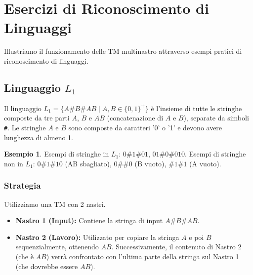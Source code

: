 \documentclass[a4paper]{article}
\theoremstyle{definition} %
\newtheorem{example}{Esempio}
\begin{document}
\section{Esercizi di Riconoscimento di Linguaggi}
Illustriamo il funzionamento delle TM multinastro attraverso esempi pratici di riconoscimento di linguaggi.

\subsection{Linguaggio $L_1$}
Il linguaggio $L_1 = \{A\#B\#AB \mid A,B \in \{0,1\}^+\}$ è l'insieme di tutte le stringhe composte da tre parti $A$, $B$ e $AB$ (concatenazione di $A$ e $B$), separate da simboli \texttt{\#}. Le stringhe $A$ e $B$ sono composte da caratteri '0' o '1' e devono avere lunghezza di almeno 1.
\begin{example}
Esempi di stringhe in $L_1$: $0\texttt{\#}1\texttt{\#}01$, $01\texttt{\#}0\texttt{\#}010$.
Esempi di stringhe non in $L_1$: $0\texttt{\#}1\texttt{\#}10$ (AB sbagliato), $0\texttt{\#}\texttt{\#}0$ (B vuoto), $\texttt{\#}1\texttt{\#}1$ (A vuoto).
\end{example}

\subsubsection{Strategia}
Utilizziamo una TM con 2 nastri.
\begin{itemize}
    \item \textbf{Nastro 1 (Input):} Contiene la stringa di input $A\#B\#AB$.
    \item \textbf{Nastro 2 (Lavoro):} Utilizzato per copiare la stringa $A$ e poi $B$ sequenzialmente, ottenendo $AB$. Successivamente, il contenuto di Nastro 2 (che è $AB$) verrà confrontato con l'ultima parte della stringa sul Nastro 1 (che dovrebbe essere $AB$).
\end{itemize}
\end{document}
